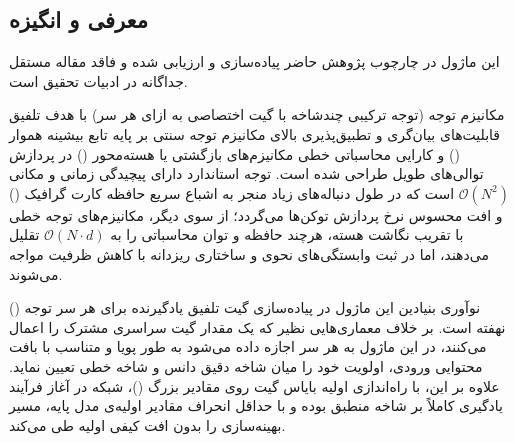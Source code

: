 \subsection{معرفی و انگیزه}
این ماژول در چارچوب پژوهش حاضر پیاده‌سازی و ارزیابی شده و فاقد مقاله مستقل جداگانه در ادبیات تحقیق است.

مکانیزم توجه  (توجه ترکیبی چندشاخه با گیت اختصاصی به ازای هر سر) با هدف تلفیق قابلیت‌های بیان‌گری و تطبیق‌پذیری بالای مکانیزم توجه سنتی بر پایه تابع بیشینه هموار () و کارایی محاسباتی خطی مکانیزم‌های بازگشتی یا هسته‌محور () در پردازش توالی‌های طویل طراحی شده است. توجه استاندارد دارای پیچیدگی زمانی و مکانی $\mathcal{O}(N^2)$ است که در طول دنباله‌های زیاد منجر به اشباع سریع حافظه کارت گرافیک () و افت محسوس نرخ پردازش توکن‌ها می‌گردد؛ از سوی دیگر، مکانیزم‌های توجه خطی با تقریب نگاشت هسته، هرچند حافظه و توان محاسباتی را به $\mathcal{O}(N \cdot d)$ تقلیل می‌دهند، اما در ثبت وابستگی‌های نحوی و ساختاری ریزدانه با کاهش ظرفیت مواجه می‌شوند.

نوآوری بنیادین این ماژول در پیاده‌سازی گیت تلفیق یادگیرنده برای هر سر توجه () نهفته است. بر خلاف معماری‌هایی نظیر  که یک مقدار گیت سراسری مشترک را اعمال می‌کنند، در این ماژول به هر سر اجازه داده می‌شود به طور پویا و متناسب با بافت محتوایی ورودی، اولویت خود را میان شاخه دقیق دانس و شاخه خطی تعیین نماید. علاوه بر این، با راه‌اندازی اولیه بایاس گیت روی مقادیر بزرگ ()، شبکه در آغاز فرآیند یادگیری کاملاً بر شاخه  منطبق بوده و با حداقل انحراف مقادیر اولیه‌ی مدل پایه، مسیر بهینه‌سازی را بدون افت کیفی اولیه طی می‌کند.
